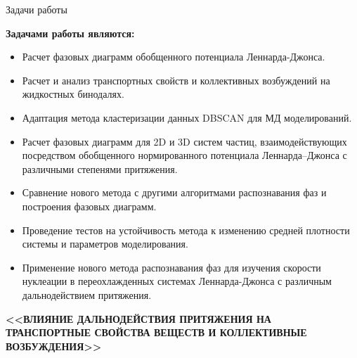 \documentclass{beamer}
\begin{document}
\begin{frame}{Задачи работы}
\footnotesize{

\textbf{Задачами работы являются:}
\begin{itemize}
\item Расчет фазовых диаграмм обобщенного потенциала Леннарда-Джонса.
\item Расчет и анализ транспортных свойств и коллективных возбуждений на жидкостных бинодалях.
\item Адаптация метода кластеризации данных DBSCAN для МД моделирований.
\item Расчет фазовых диаграмм для 2D и 3D систем частиц, взаимодействующих посредством обобщенного нормированного потенциала Леннарда--Джонса с различными степенями притяжения.
\item Сравнение нового метода с другими алгоритмами распознавания фаз и построения фазовых диаграмм.
\item Проведение тестов на устойчивость метода к изменению средней плотности системы и параметров моделирования.
\item Применение нового метода распознавания фаз для изучения скорости нуклеации в переохлажденных системах Леннарда-Джонса с различным дальнодействием притяжения.
\end{itemize}


}
\end{frame}





\begin{frame}
\begin{center}
\vspace{5mm}
\textbf{<<ВЛИЯНИЕ ДАЛЬНОДЕЙСТВИЯ ПРИТЯЖЕНИЯ НА ТРАНСПОРТНЫЕ СВОЙСТВА ВЕЩЕСТВ И КОЛЛЕКТИВНЫЕ ВОЗБУЖДЕНИЯ>>}
\end{center}
\end{frame}
\end{document}
